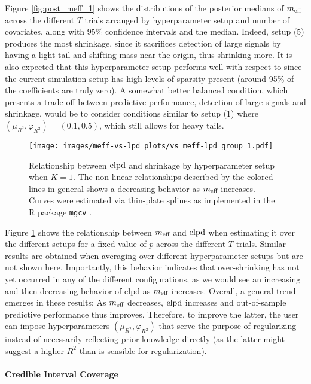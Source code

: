  Figure \ref{fig:post_meff_1} shows the distributions of the posterior medians of $m_{\text{eff} }$ across the different $T$ trials arranged by hyperparameter setup and number of covariates, along with $95\%$ confidence intervals and the median. Indeed, setup (5) produces the most shrinkage, since it sacrifices detection of large signals by having a light tail and shifting mass near the origin, thus shrinking more. It is also expected that this hyperparameter setup performs well with respect to {\elpd} since the current simulation setup has high levels of sparsity present (around 95\% of the coefficients are truly zero). A somewhat better balanced condition, which presents a trade-off between predictive performance, detection of large signals and shrinkage, would be to consider conditions similar to setup (1) where $(\mu_{R^2}, \varphi_{R^2})=(0.1,0.5)$, which still allows for heavy tails.
\begin{figure}[b!]%
	\centering
	\texttt{[image: images/meff-vs-lpd\_plots/vs\_meff-lpd\_group\_1.pdf]}
	\caption{Relationship between $\text{elpd}$ and shrinkage by hyperparameter setup when $K=1$. The non-linear relationships described by the colored lines in general shows a decreasing behavior as $m_{\text{eff} }$ increases. Curves were estimated via thin-plate splines as implemented in the R package \texttt{mgcv} \citep{Wood2011mgcv}.  }
	\label{fig:meff-vs-lpd-grouped_1}
\end{figure}
Figure \ref{fig:meff-vs-lpd-grouped_1} shows the relationship between $m_{\text{eff} }$ and $\text{elpd}$ when estimating it over the different setups for a fixed value of $p$ across the different $T$ trials. Similar results are obtained when averaging over different hyperparameter setups but are not shown here. Importantly, this behavior indicates that over-shrinking has not yet occurred in any of the different configurations, as we would see an increasing and then decreasing behavior of elpd as $m_{\text{eff} }$ increases. Overall, a general trend emerges in these results: As $m_{\text{eff} }$ decreases, $\text{elpd}$ increases and out-of-sample predictive performance thus improves. Therefore, to improve the latter, the user can impose hyperparameters $(\mu_{R^2}, \varphi_{R^2})$ that serve the purpose of regularizing instead of necessarily reflecting prior knowledge directly (as the latter might suggest a higher $R^2$ than is sensible for regularization).

\paragraph{Credible Interval Coverage}\mbox{}\\

